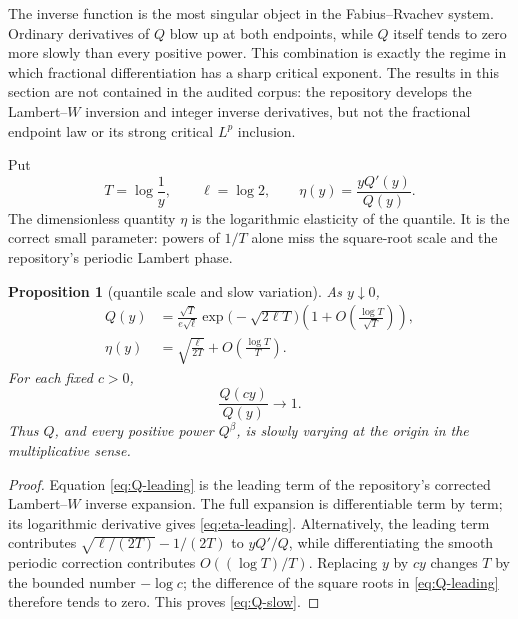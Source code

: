 \documentclass[11pt,oneside]{article}
\newtheorem{proposition}[theorem]{Proposition}
\theoremstyle{definition}
\newcommand{\Q}{Q}
\begin{document}
The inverse function is the most singular object in the Fabius--Rvachev system.
Ordinary derivatives of \(\Q\) blow up at both endpoints, while \(\Q\) itself tends to
zero more slowly than every positive power.  This combination is exactly the regime in
which fractional differentiation has a sharp critical exponent.  The results in this
section are not contained in the audited corpus: the repository develops the
Lambert--\(W\) inversion and integer inverse derivatives, but not the fractional
endpoint law or its strong critical \(L^p\) inclusion.

Put
\begin{equation}\label{eq:T-eta-def}
 T=\log\frac1y,
 \qquad \ell=\log2,
 \qquad
 \eta(y)=\frac{y\Q'(y)}{\Q(y)}.
\end{equation}
The dimensionless quantity \(\eta\) is the logarithmic elasticity of the quantile.  It
is the correct small parameter: powers of \(1/T\) alone miss the square-root scale and
the repository's periodic Lambert phase.

\begin{proposition}[quantile scale and slow variation]\label{prop:Q-slow-variation}
As \(y\downarrow0\),
\begin{align}
 \Q(y)
 &=\frac{\sqrt T}{e\sqrt\ell}
   \exp\!\bigl(-\sqrt{2\ell T}\bigr)
   \left(1+O\!\left(\frac{\log T}{\sqrt T}\right)\right),
 \label{eq:Q-leading}\\
 \eta(y)
 &=\sqrt{\frac{\ell}{2T}}
   +O\!\left(\frac{\log T}{T}\right).
 \label{eq:eta-leading}
\end{align}
For each fixed \(c>0\),
\begin{equation}\label{eq:Q-slow}
 \frac{\Q(cy)}{\Q(y)}\longrightarrow1.
\end{equation}
Thus \(\Q\), and every positive power \(\Q^\beta\), is slowly varying at the
origin in the multiplicative sense.
\end{proposition}

\begin{proof}
Equation \eqref{eq:Q-leading} is the leading term of the repository's corrected
Lambert--\(W\) inverse expansion.  The full expansion is differentiable term by term;
its logarithmic derivative gives \eqref{eq:eta-leading}.  Alternatively, the leading
term contributes
\(
 \sqrt{\ell/(2T)}-1/(2T)
\)
to \(y\Q'/\Q\), while differentiating the smooth periodic correction contributes
\(O((\log T)/T)\).  Replacing \(y\) by \(cy\) changes \(T\) by the bounded number
\(-\log c\); the difference of the square roots in \eqref{eq:Q-leading} therefore tends
to zero.  This proves \eqref{eq:Q-slow}.
\end{proof}
\end{document}
